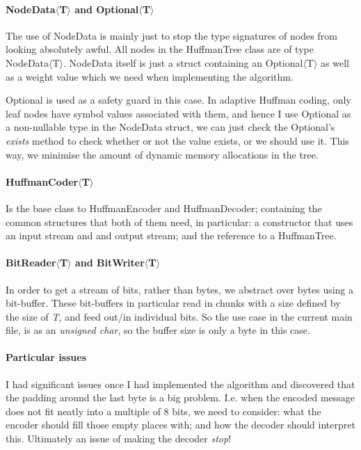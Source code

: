 \documentclass[]{article}
\begin{document}
\paragraph{NodeData$\langle$T$\rangle$ and Optional$\langle$T$\rangle$} The use of NodeData is mainly just to stop the type signatures of nodes from looking absolutely awful. All nodes in the HuffmanTree class are of type NodeData$\langle$T$\rangle$. NodeData itself is just a struct containing an Optional$\langle$T$\rangle$ as well as a weight value which we need when implementing the algorithm.

Optional is used as a safety guard in this case. In adaptive Huffman coding, only leaf nodes have symbol values associated with them, and hence I use Optional as a non-nullable type in the NodeData struct, we can just check the Optional's \emph{exists} method to check whether or not the value exists, or we should use it. This way, we minimise the amount of dynamic memory allocations in the tree.
\paragraph{HuffmanCoder$\langle$T$\rangle$} Is the base class to HuffmanEncoder and HuffmanDecoder; containing the common structures that both of them need, in particular: a constructor that uses an input stream and and output stream; and the reference to a HuffmanTree.
\paragraph{BitReader$\langle$T$\rangle$ and BitWriter$\langle$T$\rangle$} In order to get a stream of bits, rather than bytes, we abstract over bytes using a bit-buffer. These bit-buffers in particular read in chunks with a size defined by the size of \emph{T}, and feed out/in individual bits. So the use case in the current main file, is as an \emph{unsigned char}, so the buffer size is only a byte in this case.
\paragraph{Particular issues} I had significant issues once I had implemented the algorithm and discovered that the padding around the last byte is a big problem. I.e. when the encoded message does not fit neatly into a multiple of 8 bits, we need to consider: what the encoder should fill those empty places with; and how the decoder should interpret this. Ultimately an issue of making the decoder \emph{stop}!
\end{document}
